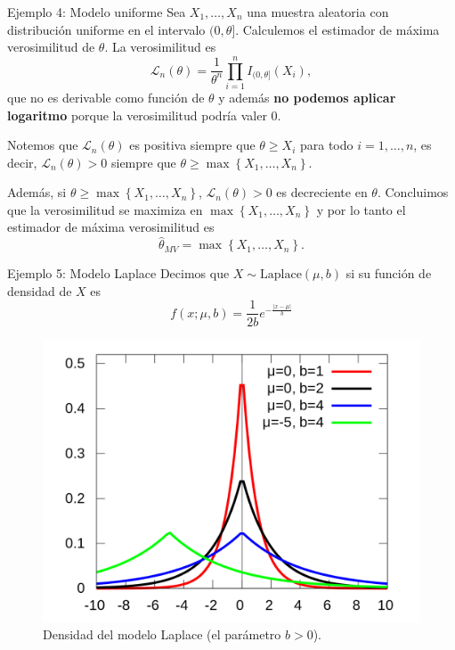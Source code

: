 \documentclass{beamer}
\theoremstyle{definition}
\begin{document}
\begin{frame}{\color{rosee}Ejemplo 4: Modelo uniforme}
  \small
    Sea $X_{1},\dots,X_{n}$ una muestra aleatoria con distribuci\'on
    uniforme en el intervalo $(0,\theta]$. Calculemos el estimador de
    m\'axima verosimilitud de $\theta$. La verosimilitud es
    \[\mathcal{L}_{n}(\theta)=\frac{1}{\theta^{n}}\prod_{i=1}^{n}I_{(0,\theta]}(X_{i}),\]
    que no es derivable como funci\'on de $\theta$ y además \textbf{no podemos aplicar logaritmo} porque la verosimilitud podría valer 0. 

    Notemos que
    $\mathcal{L}_{n}(\theta)$ es positiva siempre que $\theta \geq X_{i}$
    para todo $i=1,\dots,n$, es decir, $\mathcal{L}_{n}(\theta)>0$ siempre que
    $\theta\geq \max\left\{X_{1},\dots,X_{n} \right\}$. 

    \medskip
    
    Adem\'as, si
    $\theta\geq \max\left\{X_{1},\dots,X_{n} \right\}$,
    $\mathcal{L}_{n}(\theta)>0$ es decreciente en $\theta$. Concluimos
    que la verosimilitud se maximiza en
    $\max\left\{X_{1},\dots,X_{n} \right\}$ y por lo tanto el estimador de
    m\'axima verosimilitud es
    \[ \widehat{\theta}_{MV}=\max\left\{X_{1},\dots,X_{n} \right\}.\]
  
\end{frame}



\begin{frame}{\color{rosee}Ejemplo 5: Modelo Laplace}
    Decimos que $X\sim \text{Laplace}(\mu,b)$ si su funci\'on de densidad de $X$ es
    $$
    f(x;\mu,b)=\frac{1}{2b}e^{-\frac{\vert x - \mu\vert}{b}}
    $$
    \begin{figure}
      \centering
      \includegraphics[height=.5\textheight]{img/laplace.png}
      \caption{Densidad del modelo Laplace (el parámetro $b>0$).}
    \end{figure}

\end{frame}
\end{document}
